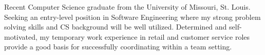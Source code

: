 \begin{cvletter}

Recent Computer Science graduate from the University of Missouri, St. Louis. Seeking an entry-level position in Software Engineering where my strong problem solving skills and CS background will be well utilized. Determined and self-motivated, my temporary work experience in retail and customer service roles provide a good basis for successfully coordinating within a team setting.
\end{cvletter}


